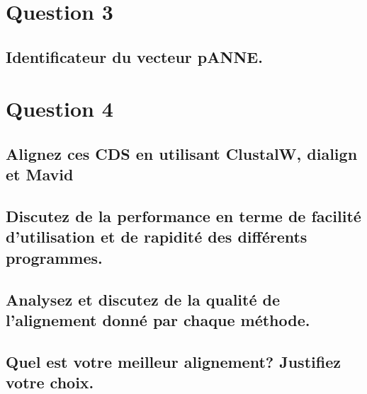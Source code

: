 \documentclass[10.9pt]{article} %
\renewcommand{\thesubsection}{\alph{subsection}}
\begin{document}
 
\section{Question 3} %

\subsection[Identification du vecteur pANNE]{Identificateur du vecteur pANNE.}


\section{Question 4} %

\subsection[Alignement multiple]{Alignez ces CDS en utilisant ClustalW, dialign et Mavid}


\subsection[Facilité et rapidité des programmes]{Discutez de la performance en terme de facilité
d'utilisation et de rapidité des différents programmes.}

\subsection[Qualité des alignements]{Analysez et discutez de la qualité de l'alignement donné par chaque méthode.}

\subsection[Meilleur alignement]{Quel est votre meilleur alignement? Justifiez votre choix.}

\begingroup
\renewcommand{\appendix}{%
    \renewcommand{\thesubsection}{\arabic{subsection}}
}
\end{document}
